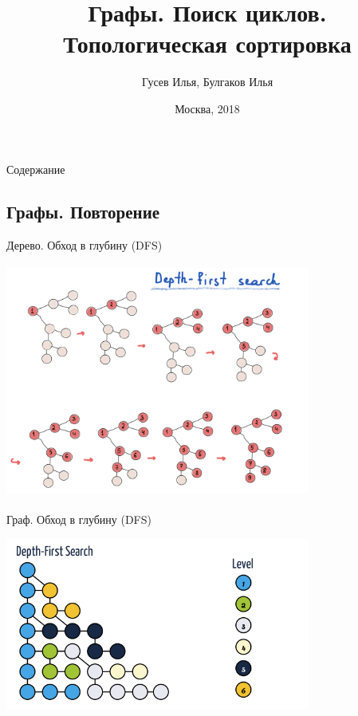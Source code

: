 \documentclass[10pt]{beamer}
\title[\href{https://goo.gl/NRgp8K}{https://goo.gl/NRgp8K} (Term 1)]{Графы. Поиск циклов. Топологическая сортировка}
\author[Гусев Илья, Булгаков Илья]{Гусев Илья, Булгаков Илья}
\institute[МФТИ] 
{Московский физико-технический институт\\*}
\date{Москва, 2018}
\begin{document}
\begin{frame}
  \titlepage
\end{frame}

\begin{frame}{Содержание}
\tableofcontents
\end{frame}

\subsection{Графы. Повторение}

\begin{frame}[fragile]{Дерево. Обход в глубину (DFS)}
\begin{center}
    \includegraphics[width=10cm, height=7.7cm]{Term_2/Source/images/1_DFS.png}
\end{center}
\end{frame}

\begin{frame}[fragile]{Граф. Обход в глубину (DFS)}
\begin{center}
    \includegraphics[width=10cm, height=5.7cm]{Term_2/Source/images/2_DFS_Graph.png}
\end{center}
\end{frame}
\end{document}
